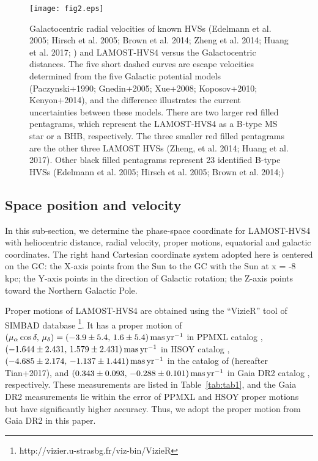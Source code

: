 \documentclass[iop, aj]{emulateapj}
\begin{document}
\begin{figure*}
\begin{center}
\texttt{[image: fig2.eps]}
\caption{Galactocentric radial velocities of known HVSs (Edelmann et al. 2005; Hirsch et al. 2005; Brown et al. 2014; Zheng et al. 2014; Huang et al. 2017; ) and LAMOST-HVS4 versus the Galactocentric distances. The five short dashed curves are escape velocities determined from the five Galactic potential models (Paczynski+1990; Gnedin+2005; Xue+2008; Koposov+2010; Kenyon+2014), and the difference illustrates the current uncertainties between these models. There are two larger red filled pentagrams, which represent the LAMOST-HVS4 as a B-type MS star or a BHB, respectively. The three smaller red filled pentagrams are the other three LAMOST HVSs (Zheng, et al. 2014; Huang et al. 2017). Other black filled pentagrams represent 23 identified B-type HVSs (Edelmann et al. 2005; Hirsch et al. 2005; Brown et al. 2014;) \label{fig:potential}}
\end{center}
\end{figure*}


\subsection{Space position and velocity}

In this sub-section, we determine the phase-space coordinate for LAMOST-HVS4 with heliocentric distance, radial velocity, proper motions, equatorial and galactic coordinates. The right hand Cartesian coordinate system adopted here is centered on the GC: the X-axis points from the Sun to the GC with the Sun at x = -8 kpc; the Y-axis points in
the direction of Galactic rotation; the Z-axis points toward the Northern Galactic Pole.

Proper motions of LAMOST-HVS4 are obtained using the ``VizieR'' tool of SIMBAD database \footnote{http://vizier.u-strasbg.fr/viz-bin/VizieR}. It has a proper motion of $(\mu_\alpha\cos\delta,\, \mu_\delta) = (-3.9\pm5.4,\, 1.6\pm 5.4)\, {\rm mas\, yr^{-1}}$ in PPMXL catalog \citep{2010AJ....139.2440R}, $(-1.644\pm2.431,\, 1.579\pm2.431)\, {\rm mas\, yr^{-1}}$ in HSOY catalog \citep{2017A&A...600L...4A}, $(-4.685\pm2.174,\, -1.137\pm1.441)\, {\rm mas\, yr^{-1}}$ in the catalog of \citet{2017ApJS..232....4T} (hereafter Tian+2017), and $(0.343\pm0.093,\, -0.288\pm0.101)\, {\rm mas\, yr^{-1}}$ in Gaia DR2 catalog \citep{2018A&A1804}, respectively. These measurements are listed in Table~\ref{tab:tab1}, and the Gaia DR2 measurements lie within the error of PPMXL and HSOY proper motions but have significantly higher accuracy. Thus, we adopt the proper motion from Gaia DR2 in this paper.
\end{document}
